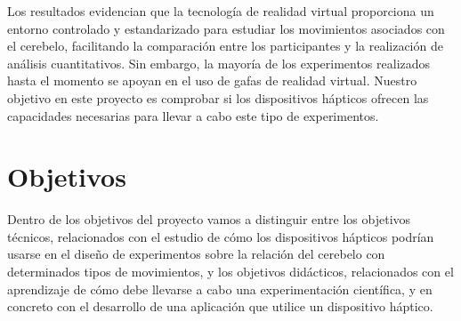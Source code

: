 \documentclass[a4paper,11pt, oneside]{book}
\begin{document}
Los resultados evidencian que la tecnología de realidad virtual proporciona un entorno controlado y estandarizado para estudiar los movimientos asociados con el cerebelo, facilitando la comparación entre los participantes y la realización de análisis cuantitativos. Sin embargo, la mayoría de los experimentos realizados hasta el momento se apoyan en el uso de gafas de realidad virtual. Nuestro objetivo en este proyecto es comprobar si los dispositivos hápticos ofrecen las capacidades necesarias para llevar a cabo este tipo de experimentos.

\section{Objetivos}

Dentro de los objetivos del proyecto vamos a distinguir entre los objetivos técnicos, relacionados con el estudio de cómo los dispositivos hápticos podrían usarse en el diseño de experimentos sobre la relación del cerebelo con determinados tipos de movimientos, y los objetivos didácticos, relacionados con el aprendizaje de cómo debe llevarse a cabo una experimentación científica, y en concreto con el desarrollo de una aplicación que utilice un dispositivo háptico.
\end{document}
